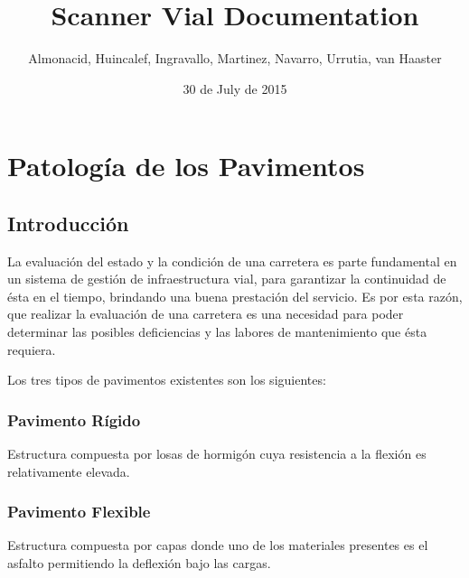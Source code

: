 \documentclass[letterpaper,10pt,spanish]{sphinxmanual}
\title{Scanner Vial Documentation}
\date{30 de July de 2015}
\author{Almonacid, Huincalef, Ingravallo, Martinez, Navarro, Urrutia, van Haaster}
\begin{document}
\maketitle
\tableofcontents
{}\label{index::doc}



\chapter{Patología de los Pavimentos}
\label{index:welcome-to-scanner-vial-s-documentation}\label{index:patologia-de-los-pavimentos}

\section{Introducción}
\label{patologia/introduccion::doc}\label{patologia/introduccion:patologia-introduccion}\label{patologia/introduccion:introduccion}
La evaluación del estado y la condición de una carretera es parte fundamental
en un sistema de gestión de infraestructura vial, para garantizar la
continuidad de ésta en el tiempo, brindando una buena prestación del servicio.
Es por esta razón, que realizar la evalua­ción de una carretera es una necesidad
para poder determinar las posibles deficiencias y las labores de mantenimiento
que ésta requiera.

Los tres tipos de pavimentos existentes son los siguientes:


\subsection{Pavimento Rígido}
\label{patologia/introduccion:pavimento-rigido}
Estructura compuesta por losas de hormigón cuya resistencia a la flexión es
relativamente elevada.


\subsection{Pavimento Flexible}
\label{patologia/introduccion:pavimento-flexible}
Estructura compuesta por capas donde uno de los materiales presentes es el
asfalto permitiendo la deflexión bajo las cargas.
\end{document}
